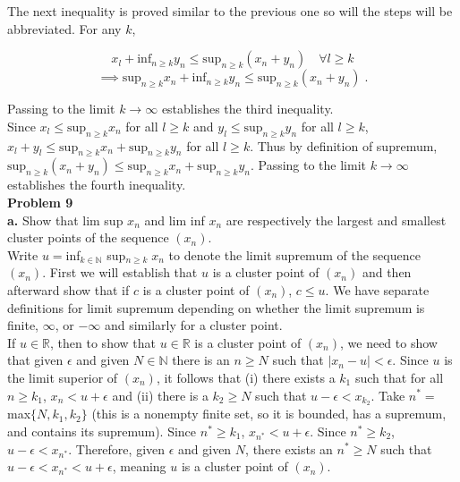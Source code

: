 \documentclass[a4paper]{article}
\begin{document}
The next inequality is proved similar to the previous one so will the steps will be abbreviated. For any $k$,

$$x_l + \text{inf}_{n\geq k} y_n \leq \text{sup}_{n\geq k} (x_n + y_n) \quad \forall l \geq k$$
$$\implies \text{sup}_{n\geq k} x_n  + \text{inf}_{n\geq k} y_n \leq \text{sup}_{n\geq k} (x_n + y_n) \;.$$

Passing to the limit $k\rightarrow \infty$ establishes the third inequality. \\

Since $x_l \leq \text{sup}_{n\geq k} x_n $ for all $l\geq k$ and $y_l \leq \text{sup}_{n\geq k} y_n$ for all $l \geq k$, $x_l + y_l \leq \text{sup}_{n\geq k} x_n + \text{sup}_{n\geq k} y_n$ for all $l\geq k$. Thus by definition of supremum, $\text{sup}_{n\geq k} (x_n+y_n) \leq \text{sup}_{n\geq k} x_n + \text{sup}_{n\geq k} y_n$. Passing to the limit $k\rightarrow \infty$ establishes the fourth inequality. \\

{\bf Problem 9}\\
{\bf a.} Show that lim sup $x_n$ and lim inf $x_n$ are respectively the largest and smallest cluster points of the sequence $(x_n)$. \\


Write $u = $inf$_{k\in \mathbb{N}} $ sup$_{n \geq k} \; x_n$ to denote the limit supremum of the sequence $(x_n)$. First we will establish that $u$ is a cluster point of $(x_n)$ and then afterward show that if $c$ is a cluster point of $(x_n)$, $c\leq u$. We have separate definitions for limit supremum depending on whether the limit supremum is finite, $\infty$, or $-\infty$ and similarly for a cluster point. \\


If $u \in \mathbb{R}$, then to show that $u \in \mathbb{R}$ is a cluster point of $(x_n)$, we need to show that given $\epsilon$ and given $N \in \mathbb{N}$ there is an $n \geq N$ such that $|x_n-u| < \epsilon$. Since $u$ is the limit superior of $(x_n)$, it follows that (i)  there exists a $k_1$ such that for all $n \geq k_1$, $x_n < u + \epsilon$ and (ii) there is a $k_2 \geq N$ such that $u - \epsilon < x_{k_2}$. Take $n^* = $ max$\{N,k_1,k_2\}$ (this is a nonempty finite set, so it is bounded, has a supremum, and contains its supremum). Since $n^* \geq k_1$, $x_{n^*} < u + \epsilon$. Since $n^* \geq k_2$, $u - \epsilon < x_{n^*}$. Therefore, given $\epsilon$ and given $N$, there exists an $n^* \geq N$ such that $u - \epsilon < x_{n^*} < u + \epsilon$, meaning $u$ is a cluster point of $(x_n)$.\\
\end{document}
